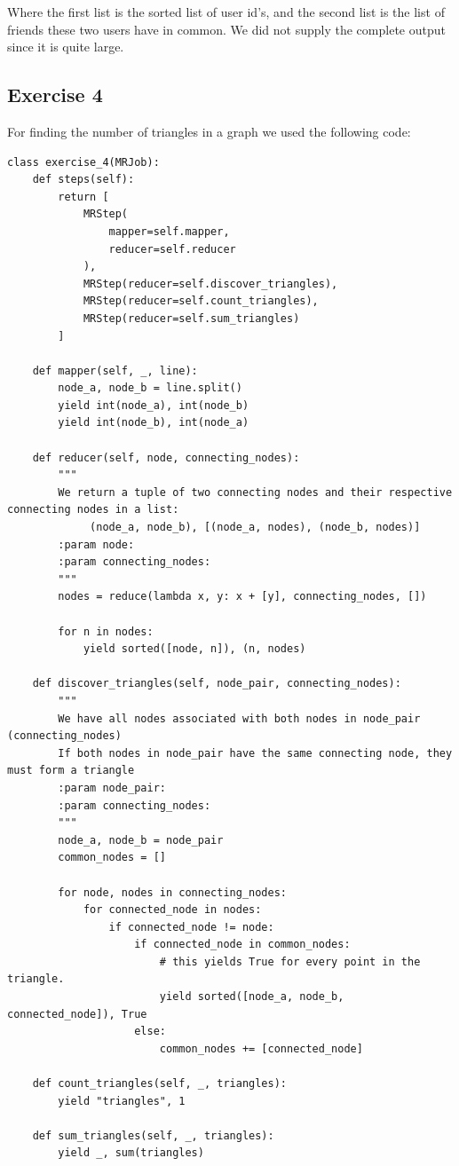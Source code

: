 \documentclass{article}
\begin{document}
Where the first list is the sorted list of user id's, and the second list is the list of friends these two users have in common. We did not supply the complete output since it is quite large.

\subsection{Exercise 4}
\label{sub:Exercise 4}

For finding the number of triangles in a graph we used the following code:

\begin{lstlisting}
class exercise_4(MRJob):
    def steps(self):
        return [
            MRStep(
                mapper=self.mapper,
                reducer=self.reducer
            ),
            MRStep(reducer=self.discover_triangles),
            MRStep(reducer=self.count_triangles),
            MRStep(reducer=self.sum_triangles)
        ]

    def mapper(self, _, line):
        node_a, node_b = line.split()
        yield int(node_a), int(node_b)
        yield int(node_b), int(node_a)

    def reducer(self, node, connecting_nodes):
        """
        We return a tuple of two connecting nodes and their respective connecting nodes in a list:
             (node_a, node_b), [(node_a, nodes), (node_b, nodes)]
        :param node:
        :param connecting_nodes:
        """
        nodes = reduce(lambda x, y: x + [y], connecting_nodes, [])

        for n in nodes:
            yield sorted([node, n]), (n, nodes)

    def discover_triangles(self, node_pair, connecting_nodes):
        """
        We have all nodes associated with both nodes in node_pair (connecting_nodes)
        If both nodes in node_pair have the same connecting node, they must form a triangle
        :param node_pair:
        :param connecting_nodes:
        """
        node_a, node_b = node_pair
        common_nodes = []

        for node, nodes in connecting_nodes:
            for connected_node in nodes:
                if connected_node != node:
                    if connected_node in common_nodes:
                        # this yields True for every point in the triangle.
                        yield sorted([node_a, node_b, connected_node]), True
                    else:
                        common_nodes += [connected_node]

    def count_triangles(self, _, triangles):
        yield "triangles", 1

    def sum_triangles(self, _, triangles):
        yield _, sum(triangles)
\end{lstlisting}
\end{document}
